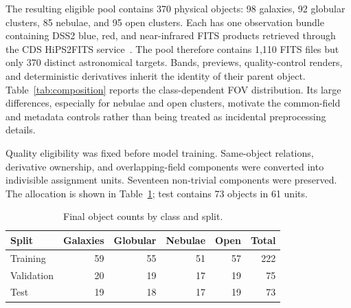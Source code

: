 \documentclass[preprint,12pt,authoryear]{elsarticle}
\begin{document}
The resulting eligible pool contains 370 physical objects:
98 galaxies, 92 globular clusters, 85 nebulae, and 95 open clusters. Each has one
observation bundle containing DSS2 blue, red, and near-infrared FITS products
retrieved through the CDS HiPS2FITS service~\cite{fernique2015,boch2020hips2fits}.
The pool therefore contains 1,110 FITS
files but only 370 distinct astronomical targets. Bands, previews, quality-control
renders, and deterministic derivatives inherit the identity of their parent object.
Table~\ref{tab:composition} reports the class-dependent FOV distribution. Its large
differences, especially for nebulae and open clusters, motivate the common-field and
metadata controls rather than being treated as incidental preprocessing details.

\begin{table}[t]
\centering
\caption{Composition of the eligible pool and five-number summary of source
FOV in arcmin. Values are computed per physical object before splitting.}
\label{tab:composition}
\end{table}

Quality eligibility was fixed before model training. Same-object relations,
derivative ownership, and overlapping-field components were converted into
indivisible assignment units. Seventeen non-trivial components were preserved. The
allocation is shown in Table~\ref{tab:split}; test contains 73 objects in 61 units.

\begin{table}[t]
\centering
\caption{Final object counts by class and split.}
\label{tab:split}
\begin{tabular}{lrrrrr}
\toprule
Split & Galaxies & Globular & Nebulae & Open & Total \\
\midrule
Training   & 59 & 55 & 51 & 57 & 222 \\
Validation & 20 & 19 & 17 & 19 & 75 \\
Test       & 19 & 18 & 17 & 19 & 73 \\
\bottomrule
\end{tabular}
\end{table}
\end{document}
